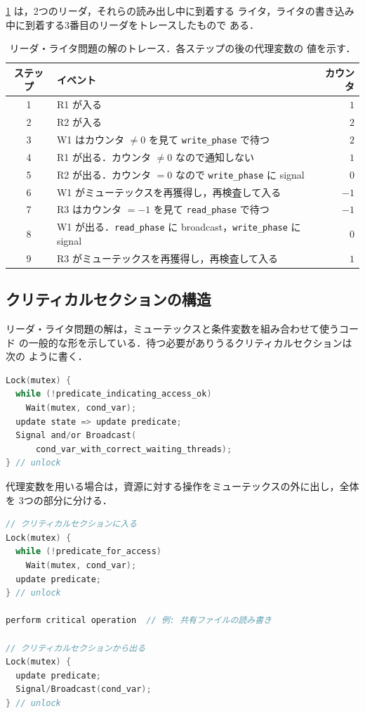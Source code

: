 \documentclass[../main.tex]{subfiles}
\begin{document}
\begin{example}
  \cref{tab:l03-rw-trace} は，2つのリーダ，それらの読み出し中に到着する
  ライタ，ライタの書き込み中に到着する3番目のリーダをトレースしたもので
  ある．
\end{example}

\begin{table}[htbp]
  \centering
  \caption{リーダ・ライタ問題の解のトレース．各ステップの後の代理変数の
    値を示す．}
  \label{tab:l03-rw-trace}
  \small
  \begin{tabular}{@{}clr@{}}
    \toprule
    ステップ & イベント & カウンタ \\
    \midrule
    1 & R1 が入る                                               & $1$ \\
    2 & R2 が入る                                               & $2$ \\
    3 & W1 はカウンタ $\neq 0$ を見て \texttt{write\_phase} で待つ & $2$ \\
    4 & R1 が出る．カウンタ $\neq 0$ なので通知しない             & $1$ \\
    5 & R2 が出る．カウンタ $=0$ なので \texttt{write\_phase} に signal & $0$ \\
    6 & W1 がミューテックスを再獲得し，再検査して入る             & $-1$ \\
    7 & R3 はカウンタ $=-1$ を見て \texttt{read\_phase} で待つ    & $-1$ \\
    8 & W1 が出る．\texttt{read\_phase} に broadcast，\texttt{write\_phase} に signal & $0$ \\
    9 & R3 がミューテックスを再獲得し，再検査して入る             & $1$ \\
    \bottomrule
  \end{tabular}
\end{table}

\subsection{クリティカルセクションの構造}

リーダ・ライタ問題の解は，ミューテックスと条件変数を組み合わせて使うコード
の一般的な形を示している．待つ必要がありうるクリティカルセクションは次の
ように書く．
\begin{lstlisting}[language=C, numbers=none]
Lock(mutex) {
  while (!predicate_indicating_access_ok)
    Wait(mutex, cond_var);
  update state => update predicate;
  Signal and/or Broadcast(
      cond_var_with_correct_waiting_threads);
} // unlock
\end{lstlisting}
代理変数を用いる場合は，資源に対する操作をミューテックスの外に出し，全体を
3つの部分に分ける．
\begin{lstlisting}[language=C, numbers=none]
// クリティカルセクションに入る
Lock(mutex) {
  while (!predicate_for_access)
    Wait(mutex, cond_var);
  update predicate;
} // unlock

perform critical operation  // 例: 共有ファイルの読み書き

// クリティカルセクションから出る
Lock(mutex) {
  update predicate;
  Signal/Broadcast(cond_var);
} // unlock
\end{lstlisting}
\end{document}
